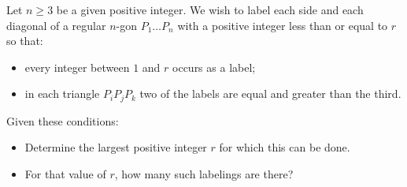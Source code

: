 Let $n \geq 3$ be a given positive integer. We wish to label each side and each diagonal of a regular $n$-gon $P_1 \ldots P_n$ with a positive integer less than or equal to $r$ so that:
\begin{itemize}
\item[(i)] every integer between $1$ and $r$ occurs as a label;
\item[(ii)] in each triangle $P_iP_jP_k$ two of the labels are equal and greater than the third.
\end{itemize}
Given these conditions:
\begin{itemize}
\item[(a)] Determine the largest positive integer $r$ for which this can be done.
\item[(b)] For that value of $r$, how many such labelings are there?
\end{itemize}
